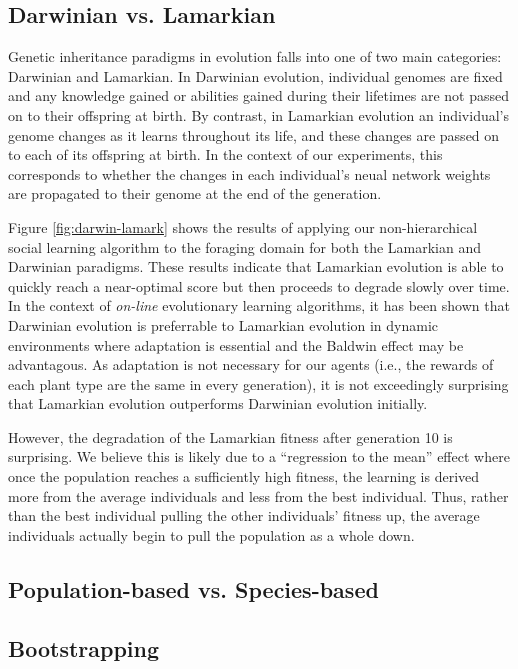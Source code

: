 \documentclass{acm_proc_article-sp}
\begin{document}
\subsection*{Darwinian vs. Lamarkian}
Genetic inheritance paradigms in evolution falls into one of two main categories: Darwinian and Lamarkian. In Darwinian evolution, individual genomes are fixed and any knowledge gained or abilities gained during their lifetimes are not passed on to their offspring at birth. By contrast, in Lamarkian evolution an individual's genome changes as it learns throughout its life, and these changes are passed on to each of its offspring at birth. In the context of our experiments, this corresponds to whether the changes in each individual's neual network weights are propagated to their genome at the end of the generation.

Figure \ref{fig:darwin-lamark} shows the results of applying our non-hierarchical social learning algorithm to the foraging domain for both the Lamarkian and Darwinian paradigms. These results indicate that Lamarkian evolution is able to quickly reach a near-optimal score but then proceeds to degrade slowly over time. In the context of \textit{on-line} evolutionary learning algorithms, it has been shown \cite{whiteson2006evolutionary} that Darwinian evolution is preferrable to Lamarkian evolution in dynamic environments where adaptation is essential and the Baldwin effect \cite{simpson1953baldwin} may be advantagous. As adaptation is not necessary for our agents (i.e., the rewards of each plant type are the same in every generation), it is not exceedingly surprising that Lamarkian evolution outperforms Darwinian evolution initially.

However, the degradation of the Lamarkian fitness after generation 10 is surprising. We believe this is likely due to a ``regression to the mean'' effect where once the population reaches a sufficiently high fitness, the learning is derived more from the average individuals and less from the best individual. Thus, rather than the best individual pulling the other individuals' fitness up, the average individuals actually begin to pull the population as a whole down.

\subsection*{Population-based vs. Species-based}


\subsection*{Bootstrapping}
\end{document}
